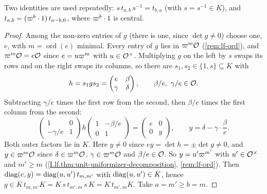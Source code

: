 \begin{definition}
\end{definition}
\noindent Two identities are used repeatedly: $s\,t_{a,b}\,s^{-1}=t_{b,a}$ (with $s=s^{-1}\in K$), and
$t_{a,b}=(\varpi^b\cdot1)\,t_{a-b,0}$, where $\varpi^b\cdot1$ is central.

\begin{lemma}
\end{lemma}
\begin{proof}
Among the non-zero entries of $g$ (there is one, since $\det g\neq0$) choose one, $e$, with $m=\operatorname{ord}(e)$
minimal. Every entry of $g$ lies in $\varpi^m\mathcal{O}$ (\cref{rem:lf-ord}), and $\varpi^m\mathcal{O}=e\mathcal{O}$ since $e=u\varpi^m$
with $u\in\mathcal{O}^\times$. Multiplying $g$ on the left by $s$ swaps its rows and on the right swaps its columns, so there
are $s_1,s_2\in\{1,s\}\subseteq K$ with
\[
  h=s_1gs_2=\begin{pmatrix}e&\beta\\\gamma&\delta\end{pmatrix},\qquad \beta/e,\ \gamma/e\in\mathcal{O} .
\]
Subtracting $\gamma/e$ times the first row from the second, then $\beta/e$ times the first column from the second:
\[
  \begin{pmatrix}1&0\\-\gamma/e&1\end{pmatrix}h\begin{pmatrix}1&-\beta/e\\0&1\end{pmatrix}
  =\begin{pmatrix}e&0\\0&y\end{pmatrix},\qquad y=\delta-\gamma\cdot\frac{\beta}{e}.
\]
Both outer factors lie in $K$. Here $y\neq0$ since $ey=\det h=\pm\det g\neq0$, and $y\in\varpi^m\mathcal{O}$ since
$\delta\in\varpi^m\mathcal{O}$, $\gamma\in\varpi^m\mathcal{O}$ and $\beta/e\in\mathcal{O}$. So $y=u'\varpi^{m'}$ with $u'\in\mathcal{O}^\times$
and $m'\ge m$ (\cref{I.lf.thm:unit-uniformizer-decomposition}, \cref{rem:lf-ord}). Then
$\operatorname{diag}(e,y)=\operatorname{diag}(u,u')\,t_{m,m'}$ with $\operatorname{diag}(u,u')\in K$, hence $g\in K\,t_{m,m'}K=K\,s\,t_{m',m}\,s\,K=K\,t_{m',m}K$.
Take $a=m'\ge b=m$.
\end{proof}


